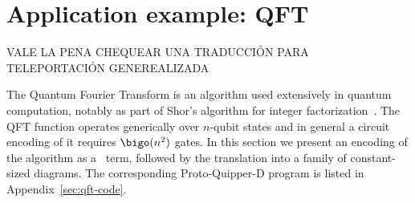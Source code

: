 \section{Application example: QFT}%
\label{sec:qft-example}%

{\color{red} VALE LA PENA CHEQUEAR UNA TRADUCCIÓN PARA TELEPORTACIÓN GENEREALIZADA}

The Quantum Fourier Transform is an algorithm used extensively in quantum computation,
notably as part of Shor's algorithm for integer factorization~\cite{nielsen_chuang_quantum_programming}.
The QFT function operates generically over $n$-qubit states and in general a circuit encoding of it
requires $\bigo(n^2)$ gates.
In this section we present an encoding of the algorithm as a \lambdaD\ term,
followed by the translation into a family of constant-sized diagrams.
The corresponding Proto-Quipper-D program is listed in Appendix~\ref{sec:qft-code}.

